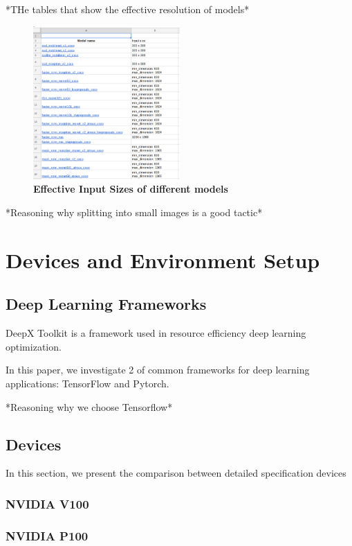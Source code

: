 \documentclass[conference]{IEEEtran}
\begin{document}
*THe tables that show the effective resolution of models*
\begin{figure}[htpb]
	  \centering
	  \includegraphics[width=0.5\textwidth]{model_input_size}
	  \caption{\textbf{Effective Input Sizes of different models}}
	  \label{fig:model_input_size}
\end{figure}

*Reasoning why splitting into small images is a good tactic*

\section{Devices and Environment Setup}

\subsection{Deep Learning Frameworks}
DeepX Toolkit is a framework used in resource efficiency deep learning optimization.

In this paper, we investigate 2 of common frameworks for deep learning applications: TensorFlow and Pytorch.

*Reasoning why we choose Tensorflow*

\subsection{Devices}
In this section, we present the comparison between detailed specification devices

\subsubsection{NVIDIA V100}

\subsubsection{NVIDIA P100}
\end{document}
